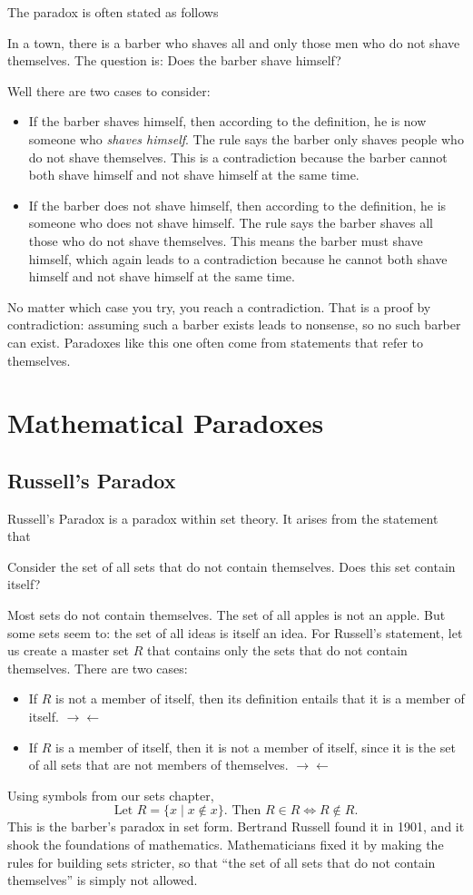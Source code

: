 The paradox is often stated as follows
\begin{theorem}
    In a town, there is a barber who shaves all and only those men who do not shave themselves. The question is: Does the barber shave himself?
\end{theorem}
Well there are two cases to consider:
\begin{itemize}
    \item If the barber shaves himself, then according to the definition, he is now someone who \textit{shaves himself}. The rule says the barber only shaves people who do not shave themselves. This is a contradiction because the barber cannot both shave himself and not shave himself at the same time.
    \item If the barber does not shave himself, then according to the definition, he is someone who does not shave himself. The rule says the barber shaves all those who do not shave themselves. This means the barber must shave himself, which again leads to a contradiction because he cannot both shave himself and not shave himself at the same time.
\end{itemize}
No matter which case you try, you reach a contradiction. That is a proof
by contradiction: assuming such a barber exists leads to nonsense, so no
such barber can exist. Paradoxes like this one often come from statements
that refer to themselves.

\section{Mathematical Paradoxes}
\subsection{Russell's Paradox}
Russell's Paradox is a paradox within set theory. It arises from the statement that
\begin{theorem}
    Consider the set of all sets that do not contain themselves. Does this set contain itself?
\end{theorem}
Most sets do not contain themselves. The set of all apples is not an
apple. But some sets seem to: the set of all ideas is itself an idea.
For Russell's statement, let us create a master set $R$ that contains only the sets that do not contain themselves. There are two cases:
\begin{itemize}
    \item If $R$ is not a member of itself, then its definition entails that it is a member of itself. $\rightarrow \leftarrow$
    \item If $R$ is a member of itself, then it is not a member of itself, since it is the set of all sets that are not members of themselves. $\rightarrow \leftarrow$
\end{itemize}
Using symbols from our sets chapter,
\[\text{Let } R = \{x \mid x \not \in x\}\text{. Then }  R\in R\iff R\not \in R.\]
This is the barber's paradox in set form. Bertrand Russell found it in
1901, and it shook the foundations of mathematics. Mathematicians fixed it
by making the rules for building sets stricter, so that ``the set of all
sets that do not contain themselves'' is simply not allowed.

